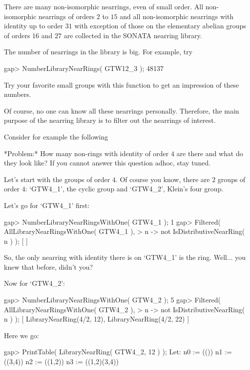 %
%

There are many non-isomorphic nearrings, even of small order.
All non-isomorphic nearrings of orders $2$ to $15$ and
all non-isomorphic nearrings with identity up
to order $31$ with exception of those on
the elementary abelian groups of orders
$16$ and $27$ are collected in the SONATA
nearring library.



The number of nearrings in the library is big.
For example, try

\beginexample
    gap> NumberLibraryNearRings( GTW12_3 );
    48137
\endexample

Try your favorite small groups with this
function to get an impression of these
numbers.

Of course, no one can know all these nearrings
personally. Therefore, the main purpose
of the nearring library is to filter out the
nearrings of interest.

Consider for example the following

*Problem:* How many non-rings with identity of order $4$ are
there  and what do they look like? If you cannot answer this
question adhoc, stay tuned. 

Let's start with the groups of order $4$. Of course you know,
there are $2$ groups of order $4$: `GTW4_1', the cyclic group
and `GTW4_2', Klein's four group.

Let's go for `GTW4_1' first:

\beginexample
    gap> NumberLibraryNearRingsWithOne( GTW4_1 );
    1
    gap> Filtered( AllLibraryNearRingsWithOne( GTW4_1 ),     
    >              n -> not IsDistributiveNearRing( n ) );
    [  ]
\endexample

So, the only nearring with identity there is
on `GTW4_1' is the ring. Well... you knew that before,
didn't you?

Now for `GTW4_2':

\beginexample
    gap> NumberLibraryNearRingsWithOne( GTW4_2 );
    5
    gap> Filtered( AllLibraryNearRingsWithOne( GTW4_2 ),
    >              n -> not IsDistributiveNearRing( n ) );
    [ LibraryNearRing(4/2, 12), LibraryNearRing(4/2, 22) ]
\endexample

Here we go:

\beginexample
    gap> PrintTable( LibraryNearRing( GTW4_2, 12 ) );
    Let:
    n0 := (())
    n1 := ((3,4))
    n2 := ((1,2))
    n3 := ((1,2)(3,4))

